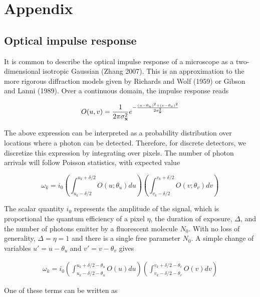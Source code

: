 \documentclass{article}
\begin{document}
\appendix

\section{Appendix}

\subsection{Optical impulse response}

It is common to describe the optical impulse response of a microscope as a two-dimensional isotropic Gaussian (Zhang 2007). This is an approximation to the more rigorous diffraction models given by Richards and Wolf (1959) or Gibson and Lanni (1989). Over a continuous domain, the impulse response reads

\begin{equation*}
O(u,v) = \frac{1}{2\pi\sigma_{\bold{x}}^{2}}e^{-\frac{(u-\theta_{u})^{2}+(v-\theta_{v})^{2}}{2\sigma_{\bold{x}}^{2}}}
\end{equation*}

The above expression can be interpreted as a probability distribution over locations where a photon can be detected. Therefore, for discrete detectors, we discretize this expression by integrating over pixels. The number of photon arrivals will follow Poisson statistics, with expected value

\begin{equation*}
\omega_{k} = i_{0}\left(\int_{u_{k}-\delta /2}^{u_{k}+\delta /2} O(u; \theta_{u})du \right)\left(\int_{v_{k}-\delta /2}^{v_{k}+\delta /2} O(v;\theta_{v})dv \right)
\end{equation*}

The scalar quantity $i_{0}$ represents the amplitude of the signal, which is proportional the quantum efficiency of a pixel $\eta$, the duration of exposure, $\Delta$, and the number of photons emitter by a fluorescent molecule $N_{0}$. With no loss of generality, $\Delta = \eta = 1$ and there is a single free parameter $N_{0}$. A simple change of variables $u' = u - \theta_{u}$ and $v' = v-\theta_{v}$ gives

\begin{align*}
\omega_{k} = i_{0}\left(\int_{u_{k}-\delta /2 - \theta_{u}}^{u_{k}+\delta /2 - \theta_{u}} O(u)du \right)\left(\int_{v_{k}-\delta /2 - \theta_{v}}^{v_{k}+\delta /2 - \theta_{v}} O(v)dv \right)
\end{align*}

One of these terms can be written as 
\end{document}
